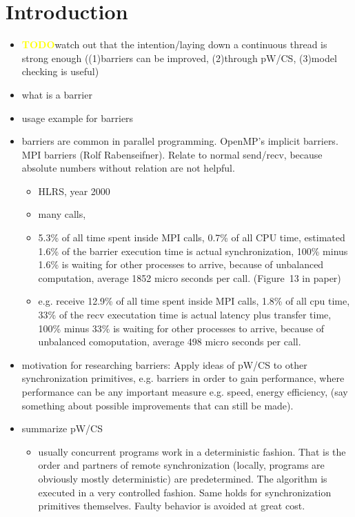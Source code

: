 \documentclass[a4paper, 10pt]{article}
\def \todo{\textbf{\textcolor{yellow}{TODO}}}
\begin{document}
\section{Introduction}
\label{sec:introduction}
\begin{itemize}
	\item \todo watch out that the intention/laying down a continuous thread is strong enough ((1)barriers can be improved, (2)through pW/CS, (3)model checking is useful)
	\item what is a barrier
	\item usage example for barriers
	\item barriers are common in parallel programming. OpenMP's\cite{openmp} implicit barriers. MPI barriers (Rolf Rabenseifner\cite{rab00}). Relate to normal send/recv, because absolute numbers without relation are not helpful.
		\begin{itemize}
			\item HLRS, year 2000
			\item many calls,
			\item 5.3\% of all time spent inside MPI calls, 0.7\% of all CPU time, estimated 1.6\% of the barrier execution time is actual synchronization, 100\% minus 1.6\% is waiting for other processes to arrive, because of unbalanced computation, average 1852 micro seconds per call. (Figure~13 in paper)
			\item e.g. receive 12.9\% of all time spent inside MPI calls, 1.8\% of all cpu time, 33\% of the recv executation time is actual latency plus transfer time, 100\% minus 33\% is waiting for other processes to arrive, because of unbalanced comoputation, average 498 micro seconds per call.
		\end{itemize}
	\item motivation for researching barriers: Apply ideas of pW/CS\cite{pwcs} to other synchronization primitives, e.g. barriers in order to gain performance, where performance can be any important measure e.g. speed, energy efficiency, (say something about possible improvements that can still be made).
	\item summarize pW/CS
		\begin{itemize}
			\item usually concurrent programs work in a deterministic fashion. That is the order and partners of remote synchronization (locally, programs are obviously mostly deterministic) are predetermined. The algorithm is executed in a very controlled fashion. Same holds for synchronization primitives themselves. Faulty behavior is avoided at great cost.

\end{itemize}
\end{itemize}
\end{document}
